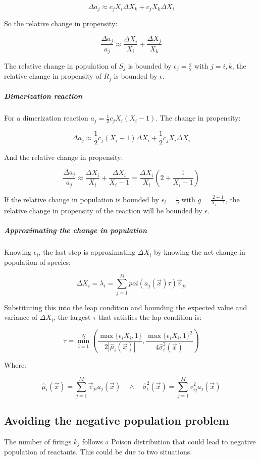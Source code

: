         $$\Delta a_j \approx c_jX_i\Delta X_k + c_jX_k\Delta X_i$$

        So the relative change in propensity:

        $$\frac{\Delta a_j}{a_j}\approx \frac{\Delta X_i}{X_i} + \frac{\Delta X_j}{X_k}$$

        The relative change in population of $S_j$ is bounded by $\epsilon_j = \frac{\epsilon}{2}$ with $j = i,k$, the relative change in propensity of $R_j$ is bounded by $\epsilon$.

        \subparagraph{Dimerization reaction}
        For a dimerization reaction $a_j = \frac{1}{2}c_jX_i(X_i-1)$.
        The change in propensity:

        $$\Delta a_j \approx\frac{1}{2}c_j(X_i-1)\Delta X_i+\frac{1}{2}c_jX_i\Delta X_i$$

        And the relative change in propensity:

        $$\frac{\Delta a_j}{a_j} \approx\frac{\Delta X_i}{X_i} + \frac{\Delta X_i}{X_i-1} = \frac{\Delta X_i}{X_i}\left(2+\frac{1}{X_i-1}\right)$$

        If the relative change in population is bounded by $\epsilon_i = \frac{\epsilon}{g}$ with $g = \frac{2+1}{X_i-1}$, the relative change in propensity of the reaction will be bounded by $\epsilon$.

        \subparagraph{Approximating the change in population}
        Knowing $\epsilon_i$, the last step is approximating $\Delta X_i$ by knowing the net change in population of species:

        $$\Delta X_i = \lambda_i = \sum\limits_{j=1}^Mpoi(a_j(\vec{x})\tau)\vec{v}_{ji}$$

        Substituting this into the leap condition and bounding the expected value and variance of $\Delta X_i$, the largest $\tau$ that satisfies the lap condition is:

        $$\tau = \min\limits_{i=1}^N\left(\frac{\max\{\epsilon_iX_i,1\}}{2|\hat{\mu}_i(\vec{x})|}, \frac{\max\{\epsilon_iX_i, 1\}^2}{4\hat{\sigma}_i^2(\vec{x})}\right)$$

        Where:

        $$\hat{\mu}_i(\vec{x}) = \sum\limits_{j=1}^M\vec{v}_{ji}a_j(\vec{x})\quad\land\quad\hat{\sigma}_i^2(\vec{x}) = \sum\limits_{j=1}^Mv_{ij}^2a_j(\vec{x})$$

  \subsection{Avoiding the negative population problem}
  The number of firings $k_j$ follows a Poison distribution that could lead to negative population of reactants.
  This could be due to two situations.

